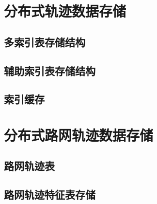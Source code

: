 \section{分布式轨迹数据存储}
\subsection{多索引表存储结构}
\subsection{辅助索引表存储结构}
\subsection{索引缓存}
\section{分布式路网轨迹数据存储}
\subsection{路网轨迹表}
\subsection{路网轨迹特征表存储}